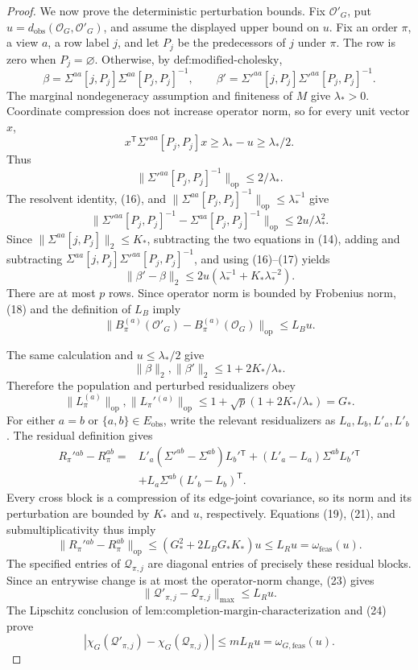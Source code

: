 \documentclass{article}
\begin{document}
\begin{proof}
We now prove the deterministic perturbation bounds.  Fix \(\mathcal O'_G\), put \(u=d_{\mathrm{obs}}(\mathcal O_G,\mathcal O'_G)\), and assume the displayed upper bound on \(u\).  Fix an order \(\pi\), a view \(a\), a row label \(j\), and let \(P_j\) be the predecessors of \(j\) under \(\pi\).  The row is zero when \(P_j=\varnothing\).  Otherwise, by \(\text{def:modified-cholesky}\),
\[
\beta=\Sigma^{aa}[j,P_j]\Sigma^{aa}[P_j,P_j]^{-1},
\qquad
\beta'=\Sigma'^{aa}[j,P_j]\Sigma'^{aa}[P_j,P_j]^{-1}.
\tag{14}
\]
The marginal nondegeneracy assumption and finiteness of \(M\) give \(\lambda_*>0\).  Coordinate compression does not increase operator norm, so for every unit vector \(x\),
\[
x^{\mathsf T}\Sigma'^{aa}[P_j,P_j]x
\ge\lambda_*-u\ge\lambda_*/2.
\tag{15}
\]
Thus
\[
\|\Sigma'^{aa}[P_j,P_j]^{-1}\|_{\mathrm{op}}\le2/\lambda_*.
\tag{16}
\]
The resolvent identity, (16), and \(\|\Sigma^{aa}[P_j,P_j]^{-1}\|_{\mathrm{op}}\le\lambda_*^{-1}\) give
\[
\|\Sigma'^{aa}[P_j,P_j]^{-1}-\Sigma^{aa}[P_j,P_j]^{-1}\|_{\mathrm{op}}
\le2u/\lambda_*^2.
\tag{17}
\]
Since \(\|\Sigma^{aa}[j,P_j]\|_2\le K_*\), subtracting the two equations in (14), adding and subtracting \(\Sigma^{aa}[j,P_j]\Sigma'^{aa}[P_j,P_j]^{-1}\), and using (16)--(17) yields
\[
\|\beta'-\beta\|_2
\le2u(\lambda_*^{-1}+K_*\lambda_*^{-2}).
\tag{18}
\]
There are at most \(p\) rows.  Since operator norm is bounded by Frobenius norm, (18) and the definition of \(L_B\) imply
\[
\|B_\pi^{(a)}(\mathcal O'_G)-B_\pi^{(a)}(\mathcal O_G)\|_{\mathrm{op}}
\le L_Bu.
\tag{19}
\]

The same calculation and \(u\le\lambda_*/2\) give
\[
\|\beta\|_2,\|\beta'\|_2\le1+2K_*/\lambda_*.
\tag{20}
\]
Therefore the population and perturbed residualizers obey
\[
\|L_\pi^{(a)}\|_{\mathrm{op}},\|L_\pi'{}^{(a)}\|_{\mathrm{op}}
\le1+\sqrt p(1+2K_*/\lambda_*)=G_*.
\tag{21}
\]
For either \(a=b\) or \(\{a,b\}\in E_{\mathrm{obs}}\), write the relevant residualizers as \(L_a,L_b,L'_a,L'_b\).  The residual definition gives
\[
\begin{aligned}
R_\pi'{}^{ab}-R_\pi^{ab}
={}&L'_a(\Sigma'^{ab}-\Sigma^{ab})L_b'{}^{\mathsf T}
+(L'_a-L_a)\Sigma^{ab}L_b'{}^{\mathsf T}\\
&+L_a\Sigma^{ab}(L'_b-L_b)^{\mathsf T}.
\end{aligned}
\tag{22}
\]
Every cross block is a compression of its edge-joint covariance, so its norm and its perturbation are bounded by \(K_*\) and \(u\), respectively.  Equations (19), (21), and submultiplicativity thus imply
\[
\|R_\pi'{}^{ab}-R_\pi^{ab}\|_{\mathrm{op}}
\le(G_*^2+2L_BG_*K_*)u
\le L_Ru=\omega_{\mathrm{feas}}(u).
\tag{23}
\]
The specified entries of \(\mathcal Q_{\pi,j}\) are diagonal entries of precisely these residual blocks.  Since an entrywise change is at most the operator-norm change, (23) gives
\[
\|\mathcal Q'_{\pi,j}-\mathcal Q_{\pi,j}\|_{\max}\le L_Ru.
\tag{24}
\]
The Lipschitz conclusion of \(\text{lem:completion-margin-characterization}\) and (24) prove
\[
|\chi_G(\mathcal Q'_{\pi,j})-\chi_G(\mathcal Q_{\pi,j})|
\le mL_Ru=\omega_{G,\mathrm{feas}}(u).
\tag{25}
\]


\end{proof}
\end{document}
